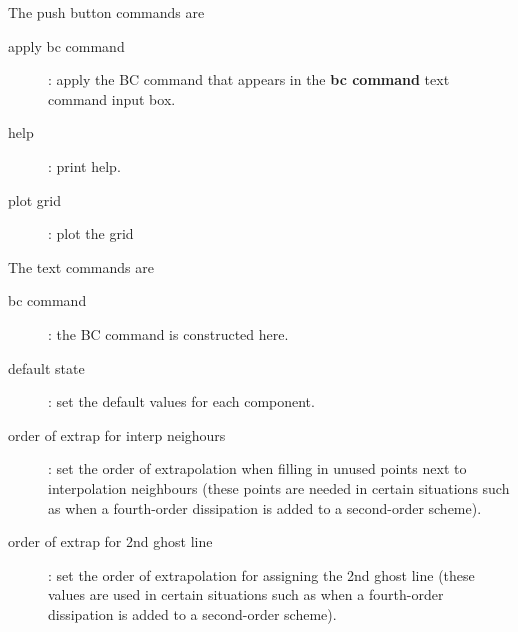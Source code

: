 \noindent The push button commands are
\begin{description}
  \item[\qquad apply bc command] : apply the BC command that appears in the {\bf bc command} text command input box.
  \item[\qquad help] : print help.
  \item[\qquad plot grid] : plot the grid
\end{description}

\noindent The text commands are
\begin{description}
  \item[\qquad bc command] : the BC command is constructed here.
  \item[\qquad default state] : set the default values for each component.
  \item[\qquad order of extrap for interp neighours] : set the order of extrapolation when filling in unused points next
         to interpolation neighbours (these points are needed in certain situations such as when a fourth-order dissipation is
           added to a second-order scheme).
  \item[\qquad order of extrap for 2nd ghost line] : set the order of extrapolation for assigning the 2nd ghost line (these
        values are used in certain situations such as when a fourth-order dissipation is
           added to a second-order scheme).
\end{description}
